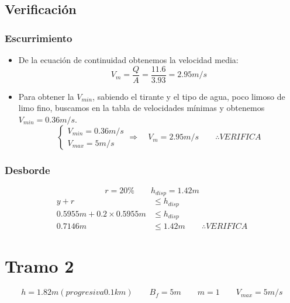 \documentclass[10.5pt]{article}
\begin{document}
\subsection*{Verificación}

\subsubsection*{Escurrimiento}

\begin{itemize}
 \item De la ecuación de continuidad obtenemos la velocidad media:
    \begin{equation*}
    V_{m} = \dfrac{Q}{A} = \dfrac{11.6}{3.93} = 2.95 m/s
    \end{equation*}
 \item Para obtener la $V_{min}$, sabiendo el tirante y el tipo de agua, poco limoso de limo fino, buscamos en
 la tabla de velocidades mínimas y obtenemos $V_{min} = 0.36 m/s$.
    \begin{equation*}
      \begin{cases}
      V_{min} = 0.36 m/s \\
      V_{max} = 5 m/s
      \end{cases}
      \Longrightarrow \quad
      V_{m} = 2.95 m/s
      \qquad
      \therefore VERIFICA
    \end{equation*}
\end{itemize}

\subsubsection*{Desborde}

\begin{equation*}
 r = 20\%
 \qquad
 h_{disp} = 1.42 m
\end{equation*}
\begin{align*}
 y + r &\leq h_{disp} \\
 0.5955 m + 0.2 \times 0.5955 m &\leq h_{disp} \\
 0.7146 m &\leq 1.42 m
 \qquad
 \therefore VERIFICA
\end{align*}



\section*{Tramo 2}


\begin{equation*}
  h = 1.82 m (progresiva 0.1 km)
 \qquad
  B_{f} = 5 m
 \qquad
  m = 1
 \qquad
  V_{max} = 5 m/s
\end{equation*}
\end{document}
